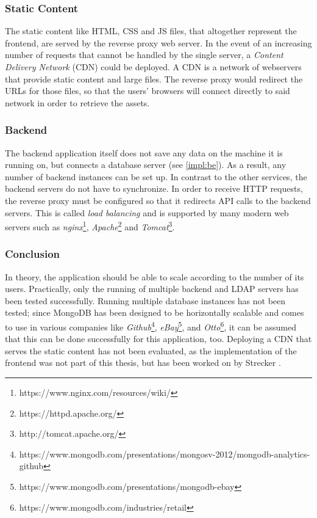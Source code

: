 \subsubsection{Static Content}
The static content like HTML, CSS and JS files, that altogether represent the frontend, are
served by the reverse proxy web server. In the event of an increasing number of requests that cannot be handled by the single server, a \textit{Content Delivery Network} (CDN) could be deployed. A CDN is a network of webservers that provide static content and large files. The reverse proxy would redirect the URLs for those files, so that the users' browsers will connect directly to said network in order to retrieve the assets.

\subsubsection{Backend}
The backend application itself does not save any data on the machine it is running on, but connects a database server (see \ref{impl:be}). As a result, any number of backend instances can be set up. In contrast to the other services, the backend servers do not have to synchronize. In order to receive HTTP requests, the reverse proxy must be configured so that it redirects API calls to the backend servers. This is called \textit{load balancing} and is supported by many modern web servers such as \textit{nginx}\footnote{https://www.nginx.com/resources/wiki/}, \textit{Apache}\footnote{https://httpd.apache.org/} and \textit{Tomcat}\footnote{http://tomcat.apache.org/}.

\newpage

\subsubsection{Conclusion}
In theory, the application should be able to scale according to the number of its users. Practically, only the running of multiple backend and LDAP servers has been tested successfully. Running multiple database instances has not been tested; since MongoDB has been designed to be horizontally scalable and comes to use in various companies like
\textit{Github}\footnote{https://www.mongodb.com/presentations/mongosv-2012/mongodb-analytics-github},
\textit{eBay}\footnote{https://www.mongodb.com/presentations/mongodb-ebay}, and
\textit{Otto}\footnote{https://www.mongodb.com/industries/retail}, it can be assumed that this can be done successfully for this application, too.
Deploying a CDN that serves the static content has not been evaluated, as the implementation of the frontend was not part of this thesis, but has been worked on by Strecker \cite{strecker}.


